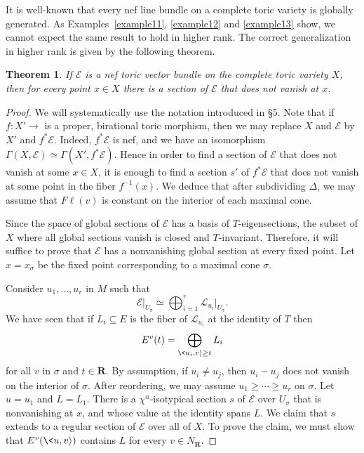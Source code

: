 \documentclass[12pt]{amsart}
\newtheorem{theorem}[lemma]{Theorem}
\theoremstyle{definition}
\theoremstyle{remark}
\begin{document}
It is well-known that every nef line bundle on a complete toric
variety is globally generated. As Examples~\ref{example11}, \ref{example12}
and \ref{example13} show, we cannot expect the same result to hold in higher rank.
The correct generalization in higher rank is given 
by the following theorem.

\begin{theorem}\label{sections}
If ${\mathcal{E}}$ is a nef toric vector bundle on the complete toric variety
$X$, then for every point $x\in X$ there is a section of ${\mathcal{E}}$ that
does not vanish at $x$.
\end{theorem}

\begin{proof}
We will systematically use the notation introduced in \S 5. Note
that if $f\colon X'{\xrightarrow{\ \ }}$ is a proper, birational toric morphism,
then we may replace $X$ and ${\mathcal{E}}$ by $X'$ and $f^*{\mathcal{E}}$. Indeed,
$f^*{\mathcal{E}}$ is nef, and we have an isomorphism
$\Gamma(X,{\mathcal{E}})\simeq\Gamma(X',f^*{\mathcal{E}})$. Hence in order to find a
section of ${\mathcal{E}}$ that does not vanish at some $x\in X$, it is enough
to find a section $s'$ of $f^*{\mathcal{E}}$ that does not vanish at some
point in the fiber $f^{-1}(x)$. We deduce that after subdividing
$\Delta$, we may assume that ${F\ell}(v)$ is constant on the interior of
each maximal cone.

Since the space of global sections of ${\mathcal{E}}$ has a basis of
$T$-eigensections, the subset of $X$ where all global sections
vanish is closed and $T$-invariant.  Therefore, it will suffice to
prove that ${\mathcal{E}}$ has a nonvanishing global section at every fixed
point. Let $x = x_\sigma$ be the fixed point corresponding to a
maximal cone $\sigma$.

Consider $u_1, \ldots, u_r$ in $M$ such that
$${\mathcal{E}}\vert_{U_{\sigma}}
\simeq\bigoplus_{i=1}^r{\mathcal{L}}_{u_i}\vert_{U_{\sigma}}.$$ We have seen
that if $L_i\subseteq E$ is the fiber of ${\mathcal{L}}_{u_i}$ at the identity
of $T$ then $$E^v(t) = \bigoplus_{\<u_i, v{\rangle} \geq t} L_i$$ for all
$v$ in $\sigma$ and $t \in {{\mathbf R}}$. By assumption, if $u_i\neq u_j$,
then $u_i-u_j$ does not vanish on the interior of $\sigma$. After
reordering, we may assume $u_1 \geq \cdots \geq u_r$ on $\sigma$.
Let $u = u_1$ and $L = L_1$. There is a $\chi^u$-isotypical section
$s$ of ${\mathcal{E}}$ over $U_{\sigma}$ that is nonvanishing at $x$, and
whose value at the identity spans $L$.  We claim that $s$ extends to
a regular section of ${\mathcal{E}}$ over all of $X$.
 To prove the claim, we must show that $E^v(\<u,v{\rangle})$ contains $L$ for every $v \in N_{{\mathbf R}}$.


\end{proof}
\end{document}
